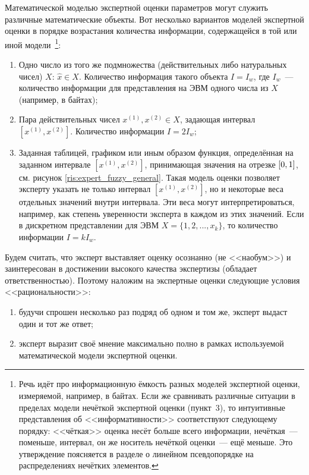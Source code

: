 Математической моделью экспертной оценки параметров могут служить различные математические объекты. Вот несколько вариантов моделей экспертной оценки в порядке возрастания количества информации, содержащейся в той или иной модели~\footnote{Речь идёт про информационную ёмкость разных моделей экспертной оценки, измеряемой, например, в байтах. Если же сравнивать различные ситуации в пределах модели нечёткой экспертной оценки (пункт~3), то интуитивные представления об <<информативности>> соответствуют следующему порядку: <<чёткая>> оценка несёт больше всего информации, нечёткая~--- поменьше, интервал, он же носитель нечёткой оценки~--- ещё меньше. Это утверждение поясняется в разделе  о линейном псевдопорядке на распределениях нечётких элементов.}: 
\begin{enumerate}
  \item Одно число из того же подмножества (действительных либо натуральных чисел) $X$: $\hat{x} \in X$. Количество информация такого объекта $I = I_w$, где $I_w$~--- количество информации для представления на ЭВМ одного числа из $X$ (например, в байтах);
  \item Пара действительных чисел $x^{(1)}, x^{(2)} \in X$, задающая интервал $[x^{(1)}, x^{(2)}]$. Количество информации $I = 2I_w$;
  \item Заданная таблицей, графиком или иным образом функция, определённая на заданном интервале $[x^{(1)}, x^{(2)}]$, принимающая значения на отрезке $[0,1]$, см. рисунок \ref{ris:expert_fuzzy_general}. Такая модель оценки позволяет эксперту указать не только интервал $[x^{(1)}, x^{(2)}]$, но и некоторые веса отдельных значений внутри интервала. Эти веса могут интерпретироваться, например, как степень уверенности эксперта в каждом из этих значений. Если в дискретном представлении для ЭВМ $X = \{1, 2, ..., x_{k}\}$, то количество информации $I = kI_w$. 
\end{enumerate}

Будем считать, что эксперт выставляет оценку осознанно (не <<наобум>>) и заинтересован в достижении высокого качества экспертизы (обладает ответственностью). Поэтому наложим на экспертные оценки следующие условия <<рациональности>>:
\begin{enumerate}
 \item будучи спрошен несколько раз подряд об одном и том же, эксперт выдаст один и тот же ответ; 
 \item эксперт выразит своё мнение максимально полно в рамках используемой математической модели экспертной оценки.
\end{enumerate}

